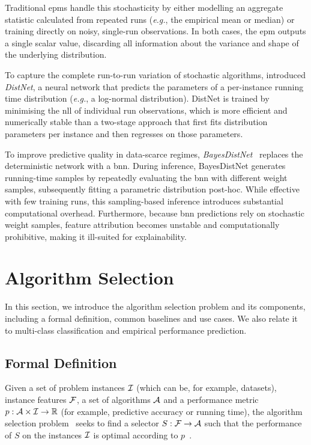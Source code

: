 Traditional \glspl{epm} handle this stochasticity by either modelling an aggregate statistic calculated from repeated runs (\emph{e.g.}, the empirical mean or median) or training directly on noisy, single-run observations. In both cases, the \gls{epm} outputs a single scalar value, discarding all information about the variance and shape of the underlying distribution.

To capture the complete run-to-run variation of stochastic algorithms, \citet{EggEtAl18} introduced \emph{DistNet}, a neural network that predicts the parameters of a per-instance running time distribution (\emph{e.g.}, a log-normal distribution). DistNet is trained by minimising the \gls{nll} of individual run observations, which is more efficient and numerically stable than a two-stage approach that first fits distribution parameters per instance and then regresses on those parameters.

To improve predictive quality in data-scarce regimes, \emph{BayesDistNet}~\citep{TueBur21} replaces the deterministic network with a \Gls{bnn}. During inference, BayesDistNet generates running-time samples by repeatedly evaluating the \gls{bnn} with different weight samples, subsequently fitting a parametric distribution post-hoc. While effective with few training runs, this sampling-based inference introduces substantial computational overhead. Furthermore, because \gls{bnn} predictions rely on stochastic weight samples, feature attribution becomes unstable and computationally prohibitive, making it ill-suited for explainability.

\section{Algorithm Selection}
\label{sec:ch02:algorithm_selection}

In this section, we introduce the algorithm selection problem and its components, including a formal definition, common baselines and use cases. We also relate it to multi-class classification and empirical performance prediction.

\subsection{Formal Definition}
Given a set of problem instances $\mathcal{I}$ (which can be, for example, datasets), instance features $\mathcal{F}$, a set of algorithms $\mathcal{A}$ and a performance metric $p:\mathcal{A} \times \mathcal{I} \rightarrow \mathbb{R}$ (for example, predictive accuracy or running time), the algorithm selection problem~\citep{Rice76} seeks to find a selector $S:\mathcal{F}\rightarrow\mathcal{A}$ such that the performance of $S$ on the instances $\mathcal{I}$ is optimal according to $p$~\citep{KerEtAl19}.

